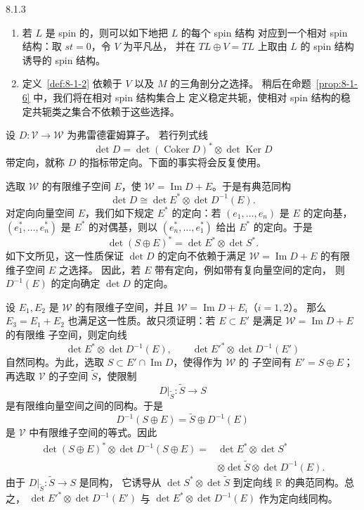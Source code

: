 \begin{remark}{8.1.3}\label{rem:8-1-3}
\begin{enumerate}[label=(\arabic*),leftmargin=2.8em]
\item 若 $L$ 是 spin 的，则可以如下地把 $L$ 的每个 spin 结构
对应到一个相对 spin 结构：取 $st=0$，令 $V$ 为平凡丛，
并在 $TL\oplus V=TL$ 上取由 $L$ 的 spin 结构诱导的 spin 结构。

\item 定义~\ref{def:8-1-2} 依赖于 $V$ 以及 $M$ 的三角剖分之选择。
稍后在命题~\ref{prop:8-1-6} 中，我们将在相对 spin 结构集合上
定义稳定共轭，使相对 spin 结构的稳定共轭类之集合不依赖于这些选择。
\end{enumerate}
\end{remark}

设 $D\colon\mathcal V\to\mathcal W$ 为弗雷德霍姆算子。
若行列式线
\[
\det D=\det(\operatorname{Coker}D)^*\otimes\det\operatorname{Ker}D
\]
带定向，就称 $D$ 的指标带定向。下面的事实将会反复使用。

选取 $\mathcal W$ 的有限维子空间 $E$，使
$\mathcal W=\operatorname{Im}D+E$。于是有典范同构
\[
\det D\cong\det E^*\otimes\det D^{-1}(E).
\]
对定向向量空间 $E$，我们如下规定 $E^*$ 的定向：若
$(e_1,\ldots,e_n)$ 是 $E$ 的定向基，
$(e_1^*,\ldots,e_n^*)$ 是 $E^*$ 的对偶基，则以
$(e_n^*,\ldots,e_1^*)$ 给出 $E^*$ 的定向。于是
\[
\det(S\oplus E)^*=\det E^*\otimes\det S^*.
\]
如下文所见，这一性质保证 $\det D$ 的定向不依赖于满足
$\mathcal W=\operatorname{Im}D+E$ 的有限维子空间 $E$ 之选择。
因此，若 $E$ 带有定向，例如带有复向量空间的定向，
则 $D^{-1}(E)$ 的定向确定 $\det D$ 的定向。

设 $E_1,E_2$ 是 $\mathcal W$ 的有限维子空间，并且
$\mathcal W=\operatorname{Im}D+E_i$（$i=1,2$）。
那么 $E_3=E_1+E_2$ 也满足这一性质。故只须证明：若
$E\subset E'$ 是满足 $\mathcal W=\operatorname{Im}D+E$ 的有限维
子空间，则定向线
\[
\det E^*\otimes\det D^{-1}(E),\qquad
\det E'^*\otimes\det D^{-1}(E')
\]
自然同构。为此，选取
$S\subset E'\cap\operatorname{Im}D$，使得作为 $\mathcal W$ 的
子空间有 $E'=S\oplus E$；再选取 $\mathcal V$ 的子空间
$\widetilde S$，使限制
\[
D|_{\widetilde S}\colon\widetilde S\longrightarrow S
\]
是有限维向量空间之间的同构。于是
\[
D^{-1}(S\oplus E)=\widetilde S\oplus D^{-1}(E)
\]
是 $\mathcal V$ 中有限维子空间的等式。因此
\[
\begin{split}
\det(S\oplus E)^*\otimes\det D^{-1}(S\oplus E)
={}&\det E^*\otimes\det S^*\\
&\otimes\det\widetilde S\otimes\det D^{-1}(E).
\end{split}
\]
由于 $D|_{\widetilde S}\colon\widetilde S\to S$ 是同构，
它诱导从 $\det S^*\otimes\det\widetilde S$ 到定向线
$\mathbb R$ 的典范同构。总之，
$\det E'^*\otimes\det D^{-1}(E')$ 与
$\det E^*\otimes\det D^{-1}(E)$ 作为定向线同构。%

